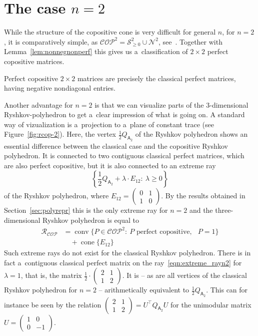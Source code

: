 \documentclass{commat}
\newcommand{\sR}{\mathcal{R}}
\DeclareMathOperator{\cone}{cone}
\DeclareMathOperator{\conv}{conv}
\newcommand{\stwo}{{\mathcal{S}}^{2}}
\newcommand{\cop}{{\mathcal{COP}}}
\newcommand{\coptwo}{\cop^2}
\DeclareMathOperator{\minC}{min_{\cop}}
\begin{document}
\section{The case \texorpdfstring{\(n=2 \)}{n=2}}\label{sec:nequal2}

While the structure of the copositive cone is very difficult for general $n$, for $n=2$,
it is comparatively simple, as \(\coptwo=\stwo_{\geq0}\cup\mathcal{N}^2 \), see~\cite{py-1993}.
Together with Lemma~\ref{lem:nonnegnonperf} this gives us a~classification of \(2\times 2 \)
perfect copositive matrices.
\begin{theorem}\label{thm:characterizeN2}
	Perfect copositive \(2 \times 2 \) matrices are precisely the classical perfect matrices,
    having negative nondiagonal entries.
\end{theorem}

Another advantage for \(n=2 \) is that we can visualize parts of the $3$-dimensional
Ryshkov-polyhedron to get a~clear impression of what is going on.
A standard way of vizualization is a~projection to a~plane of constant trace
(see Figure~\ref{fig:rcop-2}). Here, the vertex \(\frac12 Q_{\mathsf{A}_2} \)
of the Ryshkov polyhedron shows an essential difference between the classical
case and the copositive Ryshkov polyhedron.
It is connected to two contiguous classical perfect matrices, which are also
perfect copositive, but it is also connected to an extreme ray
\begin{equation}\label{eqn:extreme_rayn2}
    \left\{ \frac12 Q_{\mathsf{A}_2}+\lambda\cdot E_{12} :\ \lambda\geq0 \right\}
\end{equation}
of the Ryshkov polyhedron, where
\(E_{12}=
\begin{pmatrix}
0 & 1 \\ 1 & 0
\end{pmatrix}
\).
By the results obtained in Section~\ref{sec:polyrepr} this is the only extreme ray for \(n=2 \)
and the three-dimensional Ryshkov polyhedron is equal to
\begin{align}\label{eq:rcop-2-poly}
	\sR_\cop
	&=\conv\big\{ P\in\coptwo :\ P \text{ perfect copositive, } \minC P=1 \big\} \\
	&\quad +\cone\big\{ E_{12} \big\} \nonumber
\end{align}
Such extreme rays do not exist for the classical Ryshkov polyhedron.
There is in fact a~contiguous classical perfect matrix on
the ray~\eqref{eqn:extreme_rayn2} for \(\lambda=1 \), that is, the matrix
\(\frac12 \cdot
\begin{pmatrix}
2 & 1 \\ 1 & 2
\end{pmatrix}
\).
It is -- as are all vertices of the classical Ryshkov polyhedron for \(n=2 \) --
arithmetically equivalent to
\(\frac12 Q_{\mathsf{A}_2} \).
This can for instance be seen by the relation
\(
\begin{pmatrix}
2 & 1 \\ 1 & 2
\end{pmatrix}
=U^\intercal Q_{\mathsf{A}_2}U \)
for the unimodular matrix
\(U=
\begin{pmatrix}
1 & 0 \\ 0 & -1
\end{pmatrix}
\).
\end{document}
